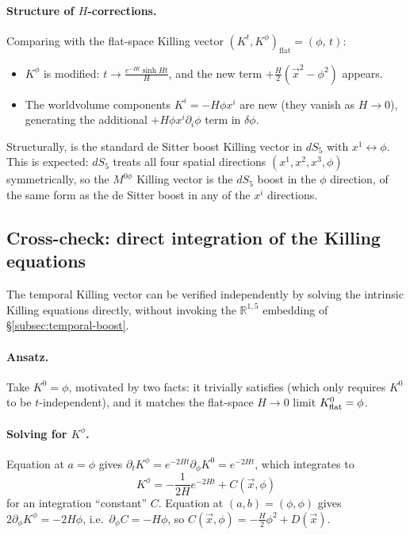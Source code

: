 \documentclass[11pt]{article}
\begin{document}
\paragraph{Structure of $H$-corrections.}
Comparing  with the flat-space Killing vector
$(K^t, K^\phi)_{\mathrm{flat}} = (\phi,\, t)$:
\begin{itemize}
\item $K^\phi$ is modified: $t \to \frac{e^{-Ht}\sinh Ht}{H}$, and the new term
      $+\frac{H}{2}(\vec{x}^2 - \phi^2)$ appears.
\item The worldvolume components $K^i = -H\phi x^i$ are new (they vanish as $H\to 0$),
      generating the additional $+H\phi x^i\partial_i\phi$ term in $\delta\phi$.
\end{itemize}
Structurally,  is the standard de Sitter boost Killing vector in $dS_5$
with $x^1 \leftrightarrow \phi$.  This is expected: $dS_5$ treats all four spatial directions
$(x^1, x^2, x^3, \phi)$ symmetrically, so the $M^{0\phi}$ Killing vector is the $dS_5$ boost in
the $\phi$ direction, of the same form as the de Sitter boost in any of the $x^i$ directions.

\subsection{Cross-check: direct integration of the Killing equations}
\label{subsec:temporal-crosscheck}

The temporal Killing vector  can be verified independently by solving
the intrinsic Killing equations  directly, without invoking the
$\mathbb{R}^{1,5}$ embedding of \S\ref{subsec:temporal-boost}.

\paragraph{Ansatz.}
Take $K^0=\phi$, motivated by two facts: it trivially satisfies  (which only
requires $K^0$ to be $t$-independent), and it matches the flat-space $H\to0$ limit
$K^0_{\rm flat}=\phi$.

\paragraph{Solving for $K^\phi$.}
Equation  at $a=\phi$ gives $\partial_tK^\phi=e^{-2Ht}\partial_\phi K^0=e^{-2Ht}$,
which integrates to
\begin{equation}
\label{eq:crosscheck-kphi-1}
K^\phi = -\frac{1}{2H}e^{-2Ht}+C(\vec{x},\phi)
\end{equation}
for an integration ``constant'' $C$. Equation  at $(a,b)=(\phi,\phi)$ gives
$2\partial_\phi K^\phi=-2H\phi$, i.e.\ $\partial_\phi C=-H\phi$, so
$C(\vec{x},\phi)=-\tfrac{H}{2}\phi^2+D(\vec{x})$.
\end{document}
